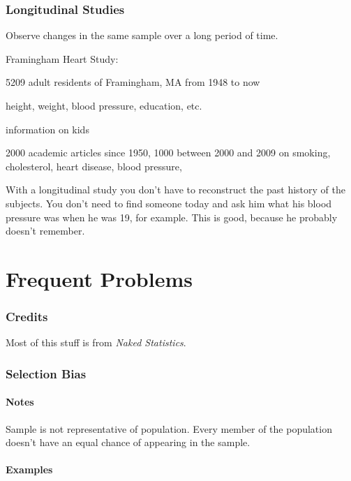 \documentclass[landscape]{exam}
\begin{document}

  \section{Longitudinal Studies} 
  Observe changes in the same sample over a long period of time.

  Framingham Heart Study:
  \begin{itemize*}
    \item 5209 adult residents of Framingham, MA from 1948 to now
    \item height, weight, blood pressure, education, etc.
    \item information on kids 
    \item 2000 academic articles since 1950, 1000 between 2000 and 2009 on
      smoking, cholesterol, heart disease, blood pressure, 
  \end{itemize*}

  With a longitudinal study you don't have to reconstruct the past history of
  the subjects. You don't need to find someone today and ask him what his blood
  pressure was when he was 19, for example. This is good, because he probably
  doesn't remember.

  \part{Frequent Problems}

  \section{Credits}
  Most of this stuff is from {\em Naked Statistics}.

  \section{Selection Bias}

  \subsection{Notes}
  Sample is not representative of population.  Every member of the population
  doesn't have an equal chance of appearing in the sample.

  \subsection{Examples}
\end{document}
